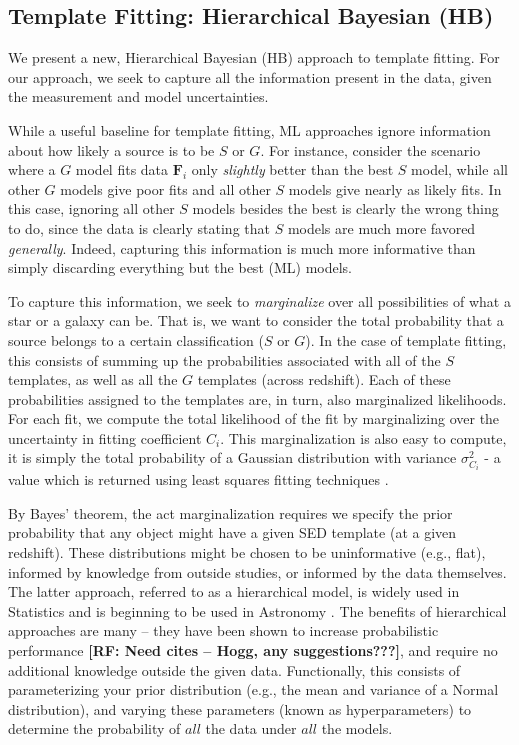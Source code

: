 \documentclass[12pt,preprint]{aastex}
\newcommand{\datavector}[1]{\boldsymbol{#1}}
\newcommand\rf[1]{{\bf [RF: #1]}}
\begin{document}
\subsection{Template Fitting: Hierarchical Bayesian (HB)}
\label{ssec:HBmethod}

We present a new, Hierarchical Bayesian (HB) approach to template fitting.  For our 
approach, we seek to capture all the information present in the data, given the 
measurement and model uncertainties.  

While a useful baseline for template 
fitting, ML approaches ignore information about how likely a source is to be 
$S$ or $G$.  For instance, consider the scenario where a $G$ model fits data 
$\datavector{F}_i$ only \textit{slightly} better than the best $S$ model, while all 
other $G$ models give poor fits and all other $S$ models give nearly as likely 
fits.  In this case, ignoring all other $S$ models besides the best is clearly the 
wrong thing to do, since the data is clearly stating that $S$ models are much 
more favored \textit{generally}.  Indeed, capturing this information is 
much more informative than simply discarding everything but the 
best (ML) models. 

To capture this information, we seek to \textit{marginalize} over all possibilities 
of what a star or a galaxy can be.  That is, we want to consider the total probability 
that a source belongs to a certain classification ($S$ or $G$).  In the case of template 
fitting, this consists of summing up the probabilities associated with all of the $S$ 
templates, as well as all the $G$ templates (across redshift).  Each of these probabilities 
assigned to the templates are, in turn, also marginalized likelihoods.  For each fit, we 
compute the total likelihood of the fit by marginalizing over the uncertainty in fitting 
coefficient $C_i$.  This marginalization is also easy to compute, it is simply the total 
probability of a Gaussian distribution with variance $\sigma_{C_i}^2$ - a value which 
is returned using least squares fitting techniques \citep[e.g.,][]{hogg10}.

By Bayes' theorem, the act marginalization requires we specify the prior probability 
that any object might have a given SED template (at a given redshift).  These 
distributions might be chosen to be uninformative (e.g., flat), informed by knowledge 
from outside studies, or informed by the data themselves.   The latter approach, 
referred to as a hierarchical model, is widely used in Statistics \citep[e.g.,][]{gelman03} and is 
beginning to be used in Astronomy \citep{shu12}.  The benefits of hierarchical 
approaches are many -- they have been shown to increase probabilistic performance 
\rf{Need cites -- Hogg, any suggestions???}, and require no additional knowledge outside the given data.  Functionally, 
this consists of parameterizing your prior distribution (e.g., the mean and variance of a 
Normal distribution), and varying these parameters (known as hyperparameters) 
to determine the probability of $all$ the data under $all$ the models.  
\end{document}
